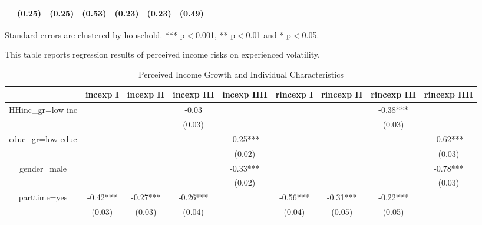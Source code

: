\documentclass[12pt,notitlepage,onecolumn,aps,pra]{article}
\begin{document}
\begin{table}[p]
\begin{adjustbox}{width=\textwidth}
\begin{threeparttable}
\begin{tabular}{lllllll}
                 &    (0.25) &    (0.25) &     (0.53) &    (0.23) &     (0.23) &      (0.49) \\
\bottomrule
\end{tabular}
\begin{tablenotes}\item Standard errors are clustered by household. *** p$<$0.001, ** p$<$0.01 and * p$<$0.05. 
\item This table reports regression results of perceived income risks on experienced volatility.
\end{tablenotes}
\end{threeparttable}
\end{adjustbox}
\end{table}
\begin{table}[p]
\centering
\begin{adjustbox}{width={\textwidth}}
\begin{threeparttable}
\caption{Perceived Income Growth and Individual Characteristics}
\label{micro_reg_exp}\begin{tabular}{ccccccccc}
\toprule
{} &  incexp I & incexp II & incexp III & incexp IIII & rincexp I & rincexp II & rincexp III & rincexp IIII \\
\midrule
HHinc\_gr=low inc &           &           &      -0.03 &             &           &            &    -0.38*** &              \\
                 &           &           &     (0.03) &             &           &            &      (0.03) &              \\
educ\_gr=low educ &           &           &            &    -0.25*** &           &            &             &     -0.62*** \\
                 &           &           &            &      (0.02) &           &            &             &       (0.03) \\
gender=male      &           &           &            &    -0.33*** &           &            &             &     -0.78*** \\
                 &           &           &            &      (0.02) &           &            &             &       (0.03) \\
parttime=yes     &  -0.42*** &  -0.27*** &   -0.26*** &             &  -0.56*** &   -0.31*** &    -0.22*** &              \\
                 &    (0.03) &    (0.03) &     (0.04) &             &    (0.04) &     (0.05) &      (0.05) &              \\

\end{tabular}
\end{threeparttable}
\end{adjustbox}
\end{table}
\end{document}
